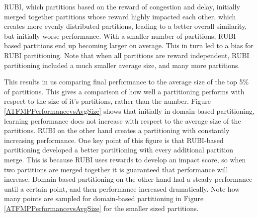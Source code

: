 \documentclass{aamas2014}
\begin{document}
RUBI, which partitions based on the reward of congestion and delay, initially merged together partitions whose reward highly impacted each other, which creates more evenly distributed partitions, leading to a better overall similarity, but initially worse performance. With a smaller number of partitions, RUBI-based partitions end up becoming larger on average. This in turn led to a bias for RUBI partitioning. Note that when all partitions are reward independent, RUBI partitioning included a much smaller average size, and many more partitions.

This results in us comparing final performance to the average size of the top 5\% of partitions. This gives a comparison of how well a partitioning performs with respect to the size of it's partitions, rather than the number. Figure \ref{ATFMPPerformancevsAvgSize} shows that initially in domain-based partitioning, learning performance does not increase with respect to the average size of the partitions. RUBI on the other hand creates a partitioning with constantly increasing performance. One key point of this figure is that RUBI-based partitioning developed a better partitioning with every additional partition merge. This is because RUBI uses rewards to develop an impact score, so when two partitions are merged together it is guaranteed that performance will increase. Domain-based partitioning on the other hand had a steady performance until a certain point, and then performance increased dramatically. Note how many points are sampled for domain-based partitioning in Figure \ref{ATFMPPerformancevsAvgSize} for the smaller sized partitions.

\end{document}
